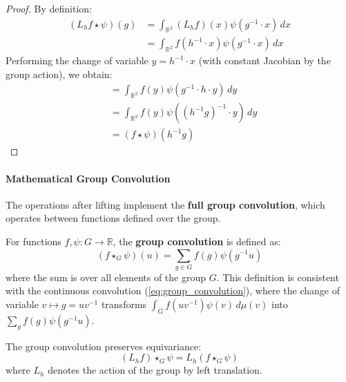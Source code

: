 \begin{proof}
By definition:
\begin{align}
(L_h f \star \psi)(g) &= \int_{\mathbb{R}^2} (L_h f)(x) \psi(g^{-1} \cdot x) \, dx \\
&= \int_{\mathbb{R}^2} f(h^{-1} \cdot x) \psi(g^{-1} \cdot x) \, dx
\end{align}
Performing the change of variable $y = h^{-1} \cdot x$ (with constant Jacobian by the group action), we obtain:
\begin{align}
&= \int_{\mathbb{R}^2} f(y) \psi(g^{-1} \cdot h \cdot y) \, dy \\
&= \int_{\mathbb{R}^2} f(y) \psi((h^{-1}g)^{-1} \cdot y) \, dy \\
&= (f \star \psi)(h^{-1}g)
\end{align}
\end{proof}

\paragraph{Mathematical Group Convolution}

The operations after lifting implement the \textbf{full group convolution}, which operates between functions defined over the group.

\begin{definition}\label{def:convolucion_grupo}
For functions $f, \psi: G \to \mathbb{R}$, the \textbf{group convolution} is defined as:
\begin{equation}
(f \star_G \psi)(u) = \sum_{g \in G} f(g) \psi(g^{-1}u)
\end{equation}
where the sum is over all elements of the group $G$. This definition is consistent with the continuous convolution (\autoref{eq:group_convolution}), where the change of variable $v \mapsto g = uv^{-1}$ transforms $\int_G f(uv^{-1})\psi(v)\,d\mu(v)$ into $\sum_g f(g)\psi(g^{-1}u)$.
\end{definition}

\begin{theorem}\label{thm:equivarianza_convolucion_grupo}
The group convolution preserves equivariance:
\begin{equation}
(L_h f) \star_G \psi = L_h (f \star_G \psi)
\end{equation}
where $L_h$ denotes the action of the group by left translation.
\end{theorem}


